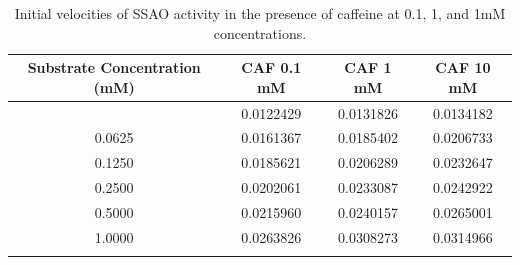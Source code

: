 \documentclass[
  letterpaper,
  DIV=11,
  numbers=noendperiod]{scrreprt}
\begin{document}
\begin{longtable}[]{@{}cccc@{}}

\toprule\noalign{}
Substrate Concentration (mM) & CAF 0.1 mM & CAF 1 mM & CAF 10 mM \\
\midrule\noalign{}
\endhead
\bottomrule\noalign{}
\endlastfoot
0.0000 & 0.0122429 & 0.0131826 & 0.0134182 \\
0.0625 & 0.0161367 & 0.0185402 & 0.0206733 \\
0.1250 & 0.0185621 & 0.0206289 & 0.0232647 \\
0.2500 & 0.0202061 & 0.0233087 & 0.0242922 \\
0.5000 & 0.0215960 & 0.0240157 & 0.0265001 \\
1.0000 & 0.0263826 & 0.0308273 & 0.0314966 \\

\caption{\label{tbl-caf-ini-v}Initial velocities of SSAO activity in the
presence of caffeine at 0.1, 1, and 1mM concentrations.}

\tabularnewline

\end{longtable}
\end{document}
